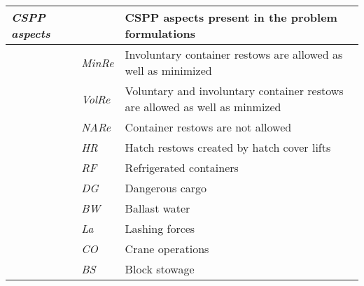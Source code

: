 \documentclass[preprint,12pt,authoryear]{elsarticle}
\begin{document}
\begin{table}
{\begin{tabular}{lll}
\hline
\textit{CSPP aspects}     &                    & CSPP aspects present in the problem formulations                                                                                                         \\ 
\hline
                          & \textit{MinRe}     & Involuntary container restows are allowed as well as minimized                                                                                           \\ 
\cline{2-3}
                          & \textit{VolRe}     & Voluntary and involuntary container restows are allowed as well as
  minmized                                                                            \\ 
\cline{2-3}
                          & \textit{NARe}      & Container restows are not allowed                                                                                                                        \\ 
\cline{2-3}
                          & \textit{HR}        & Hatch restows created by hatch cover lifts                                                                                                               \\ 
\cline{2-3}
                          & \textit{RF}        & Refrigerated containers                                                                                                                                            \\ 
\cline{2-3}
                          & \textit{DG}        & Dangerous cargo                                                                                                                                           \\ 
\cline{2-3}
                          & \textit{BW}        & Ballast water                                                                                                                                            \\ 
\cline{2-3}
                          & \textit{La}        & Lashing forces                                                                                                                                           \\ 
\cline{2-3}
                          & \textit{CO}        & Crane operations                                                                                                                                             \\ 
\cline{2-3}
                          & \textit{BS}        & Block stowage                                                                                                                                            \\ 

\end{tabular}}
\end{table}
\end{document}
